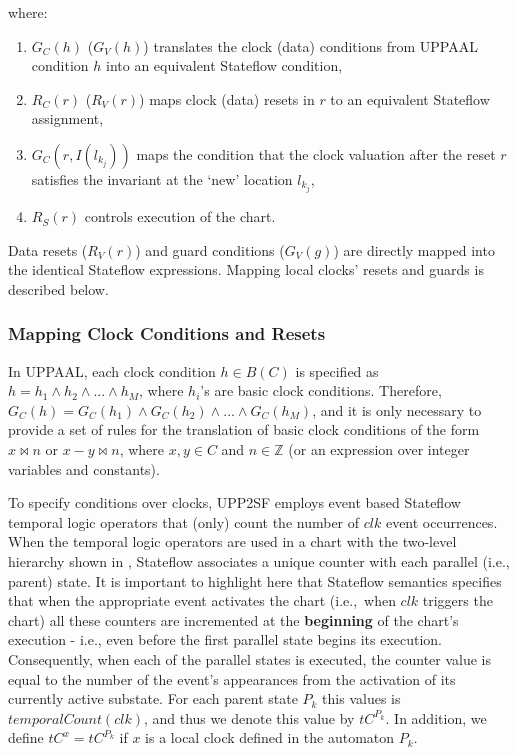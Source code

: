 \vspace{-10pt}\noindent
where:

\begin{enumerate}
\item $G_C(h)$ ($G_V(h)$) translates the clock (data) conditions from UPPAAL condition $h$ into an equivalent Stateflow condition,
\item $R_C(r)$ ($R_V(r)$) maps clock (data) resets in $r$ to an equivalent Stateflow assignment,
\item $G_C(r,I(l_{k_j}))$ maps the condition that the clock valuation after the reset $r$ satisfies the invariant at the `new' location $l_{k_j}$,
\item $R_S(r)$ controls execution of the chart.
\end{enumerate}

Data resets ($R_V(r)$) and guard conditions ($G_V(g)$) are directly mapped into the identical Stateflow expressions. Mapping local clocks' resets and guards is described below.

\subsubsection{Mapping Clock Conditions and Resets}

In UPPAAL, each clock condition $h\in B(C)$ is specified as $h=h_1\wedge h_2\wedge...\wedge h_M$, where $h_i$'s are basic clock conditions.  Therefore, $G_C(h)=G_C(h_1)\wedge G_C(h_2)\wedge...\wedge G_C(h_M)$, and it is only necessary to provide a set of rules for the translation of basic clock conditions of the form $x\bowtie n$ or $x-y\bowtie n$, where $x,y\in C$ and $n\in\mathbb{Z}$ (or an expression over integer variables and constants).

To specify conditions over clocks, UPP2SF employs event based Stateflow temporal logic operators that (only) count the number of $clk$ event occurrences. When the temporal logic operators are used in a chart with the two-level hierarchy shown in , Stateflow associates a unique counter with each parallel (i.e., parent) state. It is important to highlight here that Stateflow semantics specifies that when the appropriate event activates the chart (i.e.,~when $clk$ triggers the chart) all these counters are incremented at the \textbf{beginning} of the chart's execution - i.e., even before the first parallel state begins its execution. Consequently, when each of the parallel states is executed, the counter value is equal to the number of the event's appearances from the activation of its currently active substate. For each parent state $P_k$ this values is $temporalCount(clk)$, and thus we denote this value by $tC^{P_k}$. In addition, we define $tC^x=tC^{P_k}$ if $x$ is a local clock defined in the automaton $P_k$.

